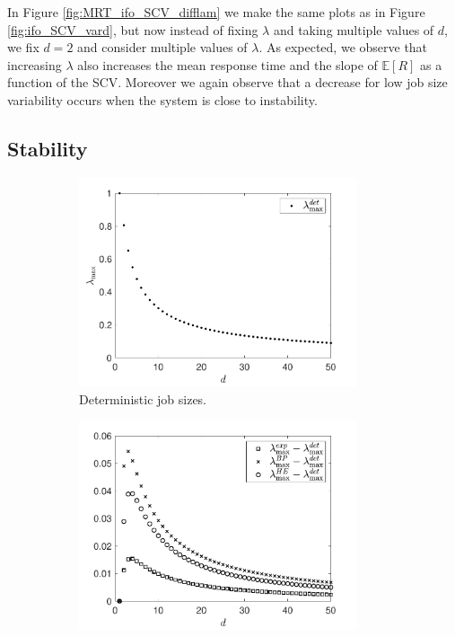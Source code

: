 \documentclass[12pt]{report}
\newcommand{\E}{\mathbb{E}}
\begin{document}
In Figure \ref{fig:MRT_ifo_SCV_difflam} we make the same plots as in Figure \ref{fig:ifo_SCV_vard}, but now instead of fixing $\lambda$ and taking multiple values of $d$, we fix $d=2$ and consider multiple values of $\lambda$. As expected, we observe that increasing $\lambda$ also increases the mean response time and the slope of $\E[R]$ as a function of the SCV. Moreover we again observe that a decrease for low job size variability occurs when the system is close to instability.

\subsection{Stability}\label{sec:stab_id}
\begin{figure}[t]
\begin{subfigure}{.45\textwidth}
\begin{center}
\includegraphics[width=0.9\textwidth]{figures/Chapter3/plot_ifo_d1.pdf}
\caption{Deterministic job sizes.}
\label{fig:lam_max_red1}
\end{center}
\end{subfigure}
\begin{subfigure}{.45\textwidth}
\begin{center}
\includegraphics[width=0.9\textwidth]{figures/Chapter3/plot_ifo_d2.pdf}

\end{center}
\end{subfigure}
\end{figure}
\end{document}
